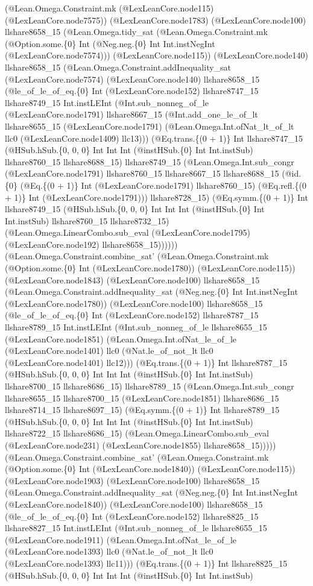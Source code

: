 \documentclass[11pt]{article}
\begin{document}
(@Lean.Omega.Constraint.mk (@LexLeanCore.node115) (@LexLeanCore.node7575)) (@LexLeanCore.node1783) (@LexLeanCore.node100) llshare8658\_15 (@Lean.Omega.tidy\_sat (@Lean.Omega.Constraint.mk (@Option.some.\{0\} Int (@Neg.neg.\{0\} Int Int.instNegInt (@LexLeanCore.node7574))) (@LexLeanCore.node115)) (@LexLeanCore.node140) llshare8658\_15 (@Lean.Omega.Constraint.addInequality\_sat (@LexLeanCore.node7574) (@LexLeanCore.node140) llshare8658\_15 (@le\_of\_le\_of\_eq.\{0\} Int (@LexLeanCore.node152) llshare8747\_15 llshare8749\_15 Int.instLEInt (@Int.sub\_nonneg\_of\_le (@LexLeanCore.node1791) llshare8667\_15 (@Int.add\_one\_le\_of\_lt llshare8655\_15 (@LexLeanCore.node1791) (@Lean.Omega.Int.ofNat\_lt\_of\_lt llc0 (@LexLeanCore.node1409) llc13))) (@Eq.trans.\{(0 + 1)\} Int llshare8747\_15 (@HSub.hSub.\{0, 0, 0\} Int Int Int (@instHSub.\{0\} Int Int.instSub) llshare8760\_15 llshare8688\_15) llshare8749\_15 (@Lean.Omega.Int.sub\_congr (@LexLeanCore.node1791) llshare8760\_15 llshare8667\_15 llshare8688\_15 (@id.\{0\} (@Eq.\{(0 + 1)\} Int (@LexLeanCore.node1791) llshare8760\_15) (@Eq.refl.\{(0 + 1)\} Int (@LexLeanCore.node1791))) llshare8728\_15) (@Eq.symm.\{(0 + 1)\} Int llshare8749\_15 (@HSub.hSub.\{0, 0, 0\} Int Int Int (@instHSub.\{0\} Int Int.instSub) llshare8760\_15 llshare8732\_15) (@Lean.Omega.LinearCombo.sub\_eval (@LexLeanCore.node1795) (@LexLeanCore.node192) llshare8658\_15)))))) (@Lean.Omega.Constraint.combine\_sat' (@Lean.Omega.Constraint.mk (@Option.some.\{0\} Int (@LexLeanCore.node1780)) (@LexLeanCore.node115)) (@LexLeanCore.node1843) (@LexLeanCore.node100) llshare8658\_15 (@Lean.Omega.Constraint.addInequality\_sat (@Neg.neg.\{0\} Int Int.instNegInt (@LexLeanCore.node1780)) (@LexLeanCore.node100) llshare8658\_15 (@le\_of\_le\_of\_eq.\{0\} Int (@LexLeanCore.node152) llshare8787\_15 llshare8789\_15 Int.instLEInt (@Int.sub\_nonneg\_of\_le llshare8655\_15 (@LexLeanCore.node1851) (@Lean.Omega.Int.ofNat\_le\_of\_le (@LexLeanCore.node1401) llc0 (@Nat.le\_of\_not\_lt llc0 (@LexLeanCore.node1401) llc12))) (@Eq.trans.\{(0 + 1)\} Int llshare8787\_15 (@HSub.hSub.\{0, 0, 0\} Int Int Int (@instHSub.\{0\} Int Int.instSub) llshare8700\_15 llshare8686\_15) llshare8789\_15 (@Lean.Omega.Int.sub\_congr llshare8655\_15 llshare8700\_15 (@LexLeanCore.node1851) llshare8686\_15 llshare8714\_15 llshare8697\_15) (@Eq.symm.\{(0 + 1)\} Int llshare8789\_15 (@HSub.hSub.\{0, 0, 0\} Int Int Int (@instHSub.\{0\} Int Int.instSub) llshare8722\_15 llshare8686\_15) (@Lean.Omega.LinearCombo.sub\_eval (@LexLeanCore.node231) (@LexLeanCore.node1855) llshare8658\_15))))) (@Lean.Omega.Constraint.combine\_sat' (@Lean.Omega.Constraint.mk (@Option.some.\{0\} Int (@LexLeanCore.node1840)) (@LexLeanCore.node115)) (@LexLeanCore.node1903) (@LexLeanCore.node100) llshare8658\_15 (@Lean.Omega.Constraint.addInequality\_sat (@Neg.neg.\{0\} Int Int.instNegInt (@LexLeanCore.node1840)) (@LexLeanCore.node100) llshare8658\_15 (@le\_of\_le\_of\_eq.\{0\} Int (@LexLeanCore.node152) llshare8825\_15 llshare8827\_15 Int.instLEInt (@Int.sub\_nonneg\_of\_le llshare8655\_15 (@LexLeanCore.node1911) (@Lean.Omega.Int.ofNat\_le\_of\_le (@LexLeanCore.node1393) llc0 (@Nat.le\_of\_not\_lt llc0 (@LexLeanCore.node1393) llc11))) (@Eq.trans.\{(0 + 1)\} Int llshare8825\_15 (@HSub.hSub.\{0, 0, 0\} Int Int Int (@instHSub.\{0\} Int Int.instSub) 
\end{document}
